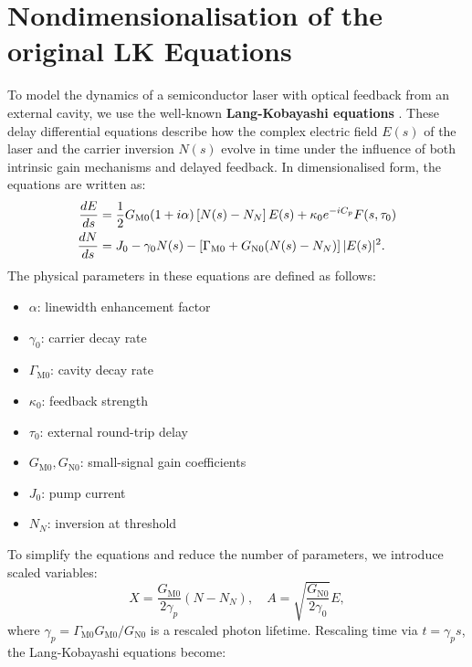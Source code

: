 \section{Nondimensionalisation of the original LK Equations}
\label{sec:LK_nondim}
%
\let\cleardoublepage\origcleardoublepage
%
To model the dynamics of a semiconductor laser with optical feedback from an external cavity, we use the well-known \textbf{Lang-Kobayashi equations} \cite{lang1980external}. These delay differential equations describe how the complex electric field \( E(s) \) of the laser and the carrier inversion \( N(s) \) evolve in time under the influence of both intrinsic gain mechanisms and delayed feedback. In dimensionalised form, the equations are written as:
%
\begin{gather}
\label{eq:dimensionalised_LK}
\begin{aligned}
\frac{d E}{d s} &= \frac{1}{2} G_{\mathrm{M}0}(1 + i \alpha) \left[N(s) - N_N\right] E(s) + \kappa_0 e^{-i C_p} F(s, \tau_0)\\
\frac{d N}{d s} &= J_0 - \gamma_0 N(s) - \left[\Gamma_{\mathrm{M}0} + G_{\mathrm{N}0}(N(s) - N_N)\right] |E(s)|^2.\\
\end{aligned}
\raisetag{-1.5em} %
\end{gather}
%
The physical parameters in these equations are defined as follows:
\begin{itemize}
  \item \( \alpha \): linewidth enhancement factor
  \item \( \gamma_0 \): carrier decay rate
  \item \( \Gamma_{\mathrm{M}0} \): cavity decay rate
  \item \( \kappa_0 \): feedback strength
  \item \( \tau_0 \): external round-trip delay
  \item \( G_{\mathrm{M}0}, G_{\mathrm{N}0} \): small-signal gain coefficients
  \item \( J_0 \): pump current
  \item \( N_N \): inversion at threshold
\end{itemize}
%
\par
%
To simplify the equations and reduce the number of parameters, we introduce scaled variables:
%
\[
X = \frac{G_{\mathrm{M}0}}{2 \gamma_p}(N - N_N), \quad A = \sqrt{\frac{G_{\mathrm{N}0}}{2 \gamma_0}} E,
\]
where \( \gamma_p = \Gamma_{\mathrm{M}0} G_{\mathrm{M}0} / G_{\mathrm{N}0} \) is a rescaled photon lifetime. Rescaling time via \( t = \gamma_p s \), the Lang-Kobayashi equations become:
